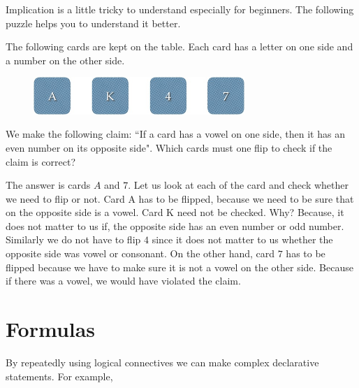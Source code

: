 Implication is a little tricky to understand especially for beginners. The following puzzle helps you to understand it better.
\begin{puzzle}[Wason]
The following cards are kept on the table. Each card has a letter on one side and a number on the other side.
\begin{figure}[h]
\centering
\includegraphics[width=8cm]{ak47.jpg}
\end{figure}
We make the following claim: ``If a card has a vowel on one side, then it has an even number on its opposite side". Which cards must one flip to check if the claim is correct?
\end{puzzle}
\begin{solution}
The answer is cards $A$ and $7$. Let us look at each of the card and check whether we need to flip or not. Card A has to be flipped, because we need to be sure that on the opposite side is a vowel. Card K need not be checked. Why? Because, it does not matter to us if, the opposite side has an even number or odd number. Similarly we do not have to flip $4$ since it does not matter to us whether the opposite side was vowel or consonant. On the other hand, card $7$ has to be flipped because we have to make sure it is not a vowel on the other side. Because if there was a vowel, we would have violated the claim.
\end{solution}

\section{Formulas}
By repeatedly using logical connectives we can make complex declarative statements. For example, 


